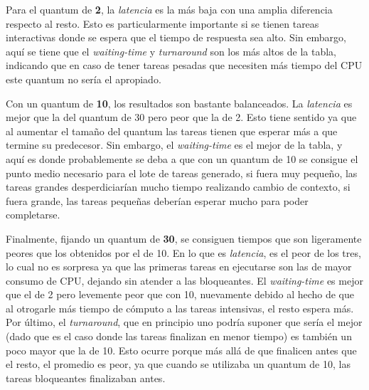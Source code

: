Para el quantum de \textbf{2}, la \emph{latencia} es la más baja con una amplia
diferencia respecto al resto. Esto es particularmente importante si se tienen
tareas interactivas donde se espera que el tiempo de respuesta sea alto. Sin
embargo, aquí se tiene que el \emph{waiting-time} y \emph{turnaround} son los
más altos de la tabla, indicando que en caso de tener tareas pesadas que
necesiten más tiempo del CPU este quantum no sería el apropiado.

Con un quantum de \textbf{10}, los resultados son bastante balanceados. La
\emph{latencia} es mejor que la del quantum de 30 pero peor que la de 2. Esto
tiene sentido ya que al aumentar el tamaño del quantum las tareas tienen que
esperar más a que termine su predecesor. Sin embargo, el \emph{waiting-time} es
el mejor de la tabla, y aquí es donde probablemente se deba a que con un quantum
de 10 se consigue el punto medio necesario para el lote de tareas generado, si
fuera muy pequeño, las tareas grandes desperdiciarían mucho tiempo
realizando cambio de contexto, si fuera grande, las tareas pequeñas deberían
esperar mucho para poder completarse.

Finalmente, fijando un quantum de \textbf{30}, se consiguen tiempos que son
ligeramente peores que los obtenidos por el de 10. En lo que es \emph{latencia},
es el peor de los tres, lo cual no es sorpresa ya que las primeras tareas en
ejecutarse son las de mayor consumo de CPU, dejando sin atender a las
bloqueantes. El \emph{waiting-time} es mejor que el de 2 pero levemente peor que
con 10, nuevamente debido al hecho de que al otrogarle más tiempo de
cómputo a las tareas intensivas, el resto espera más. Por último, el
\emph{turnaround}, que en principio uno podría suponer que sería el mejor (dado
que es el caso donde las tareas finalizan en menor tiempo) es también un
poco mayor que la de 10. Esto ocurre porque más allá de que finalicen antes que
el resto, el promedio es peor, ya que cuando se utilizaba un quantum de 10, las
tareas bloqueantes finalizaban antes.

